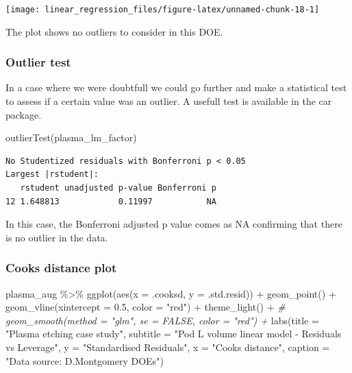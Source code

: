 \documentclass[
]{book}
\newenvironment{Shaded}{\begin{snugshade}}{\end{snugshade}}
\newcommand{\AttributeTok}[1]{\textcolor[rgb]{0.77,0.63,0.00}{#1}}
\newcommand{\CommentTok}[1]{\textcolor[rgb]{0.56,0.35,0.01}{\textit{#1}}}
\newcommand{\FloatTok}[1]{\textcolor[rgb]{0.00,0.00,0.81}{#1}}
\newcommand{\FunctionTok}[1]{\textcolor[rgb]{0.00,0.00,0.00}{#1}}
\newcommand{\NormalTok}[1]{#1}
\newcommand{\SpecialCharTok}[1]{\textcolor[rgb]{0.00,0.00,0.00}{#1}}
\newcommand{\StringTok}[1]{\textcolor[rgb]{0.31,0.60,0.02}{#1}}
\begin{document}
\texttt{[image: linear\_regression\_files/figure-latex/unnamed-chunk-18-1]}

The plot shows no outliers to consider in this DOE.

\hypertarget{outlierTest}{%
\subsubsection{Outlier test}\label{outlierTest}}

In a case where we were doubtfull we could go further and make a statistical test to assess if a certain value was an outlier. A usefull test is available in the car package.

\begin{Shaded}
\begin{Highlighting}[]
\FunctionTok{outlierTest}\NormalTok{(plasma\_lm\_factor)}
\end{Highlighting}
\end{Shaded}

\begin{verbatim}
No Studentized residuals with Bonferroni p < 0.05
Largest |rstudent|:
   rstudent unadjusted p-value Bonferroni p
12 1.648813            0.11997           NA
\end{verbatim}

In this case, the Bonferroni adjusted p value comes as NA confirming that there is no outlier in the data.

\hypertarget{cooks-distance-plot}{%
\subsubsection{Cooks distance plot}\label{cooks-distance-plot}}

\begin{Shaded}
\begin{Highlighting}[]
\NormalTok{plasma\_aug }\SpecialCharTok{\%\textgreater{}\%} 
  \FunctionTok{ggplot}\NormalTok{(}\FunctionTok{aes}\NormalTok{(}\AttributeTok{x =}\NormalTok{ .cooksd, }\AttributeTok{y =}\NormalTok{ .std.resid)) }\SpecialCharTok{+}
  \FunctionTok{geom\_point}\NormalTok{() }\SpecialCharTok{+}
  \FunctionTok{geom\_vline}\NormalTok{(}\AttributeTok{xintercept =} \FloatTok{0.5}\NormalTok{, }\AttributeTok{color =} \StringTok{"red"}\NormalTok{) }\SpecialCharTok{+}
  \FunctionTok{theme\_light}\NormalTok{() }\SpecialCharTok{+}
  \CommentTok{\# geom\_smooth(method = "glm", se = FALSE, color = "red") +}
  \FunctionTok{labs}\NormalTok{(}\AttributeTok{title =} \StringTok{"Plasma etching case study"}\NormalTok{,}
       \AttributeTok{subtitle =} \StringTok{"Pod L volume linear model {-} Residuals vs Leverage"}\NormalTok{,}
       \AttributeTok{y =} \StringTok{"Standardised Residuals"}\NormalTok{,}
       \AttributeTok{x =} \StringTok{"Cooks distance"}\NormalTok{,}
       \AttributeTok{caption =} \StringTok{"Data source: D.Montgomery DOEs"}\NormalTok{)}
\end{Highlighting}
\end{Shaded}
\end{document}

